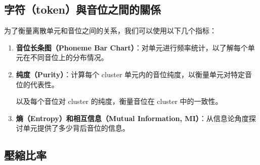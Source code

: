 \subsection{字符（token）與音位之間的關係}




为了衡量离散单元和音位之间的关系，我们可以使用以下几个指标：

\begin{enumerate}
    \item \textbf{音位长条图（Phoneme Bar Chart）}：对单元进行频率统计，以了解每个单元在不同音位上的分布情况。
    \item \textbf{纯度（Purity）}：计算每个 cluster 单元内的音位纯度，以衡量单元对特定音位的代表性。 


以及每个音位对 cluster 的纯度，衡量音位在 cluster 中的一致性。

    \item \textbf{熵（Entropy）和相互信息（Mutual Information, MI）}：从信息论角度探讨单元提供了多少背后音位的信息。 

\end{enumerate}

\subsection{壓縮比率}




